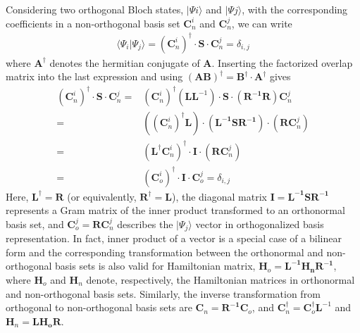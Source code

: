 \documentclass[journal=jctcce,manuscript=article,etalmode=truncate,maxauthors=10,layout=twocolumn,9pt]{achemso}   %
\begin{document}
Considering two orthogonal Bloch states,  $|\Psi i\rangle$  and  $|\Psi j\rangle$,  with the corresponding coefficients 
in a non-orthogonal basis set $\mathbf C_n^i $ and  $\mathbf C_n^j $,  we can write
\begin{align}
\langle \Psi_i |\Psi_j \rangle =  ( {\mathbf C}_n^i)^\dag  \cdot   {\mathbf S} \cdot  {\mathbf C}_n^j  =\delta_{i,j}
\end{align}
where $ {\mathbf A}^\dag$  denotes the hermitian conjugate of  $\mathbf A$.
Inserting  the factorized overlap matrix into the last expression and using 
$(\mathbf{AB})^\dag = \mathbf{B}^\dag \cdot \mathbf{A}^\dag$ gives
\begin{align}
 ({\mathbf C}_n^i  ) ^\dag \cdot   {\mathbf S} \cdot  {\mathbf C}_n^j    
\nonumber  =& ({\mathbf C}_n^i)^\dag  ( \mathbf{L L}^{-1})   \cdot   \mathbf{S} \cdot  (\mathbf {R^{-1} R}) {\mathbf C}_n^j  \\
\nonumber  =&  ( ({\mathbf C}_n^i)^\dag  \mathbf L) \cdot  (\mathbf{L^{-1} S R^{-1}  }) \cdot (\mathbf{ R C}_n^j )   \\
\nonumber  =&  (\mathbf L^\dag {\mathbf C}_n^i)^\dag \cdot \mathbf I  \cdot  (\mathbf{ R C}_n^j )    \\
 =&    ({\mathbf C}_o^i)^\dag  \cdot \mathbf I  \cdot  \mathbf{ C}_o^j 
=\delta_{i,j}
\end{align}
Here,  $\mathbf L^\dag = \mathbf R$  (or equivalently,  $\mathbf R^\dag = \mathbf L$),
  the diagonal matrix  $\mathbf I = \mathbf{L^{-1} S R^{-1}  }$ represents a Gram matrix of the inner product
 transformed to an orthonormal basis set, and  $ \mathbf{ C}_o^j = \mathbf{ R C}_n^j$  describes 
the $|\Psi_j \rangle$ vector in orthogonalized basis representation.
In fact,  inner product of a vector is a special case of a bilinear  form  and the corresponding transformation   
between the orthonormal and non-orthogonal basis sets is also valid for Hamiltonian matrix, 
$\mathbf H_o = \mathbf{L^{-1} H_n R^{-1}  }$, where $\mathbf H_o$ and $\mathbf H_n$ denote, respectively,
the Hamiltonian matrices in orthonormal and non-orthogonal basis sets.  
Similarly,  the inverse transformation from orthogonal to non-orthogonal basis sets  are
 $ \mathbf{ C}_n = \mathbf{ R^{-1} C}_o$, and  $ \mathbf{ C}^\dag_n = \mathbf C_o^\dag  \mathbf L^{-1} $
 and  $\mathbf H_n = \mathbf{L H_o R  }$.
\end{document}
